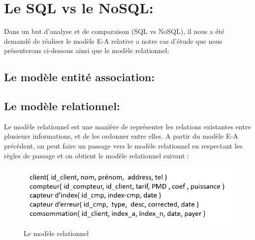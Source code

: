 \section{Le SQL vs le NoSQL:}
Dans un but d'analyse et de comparaison (SQL vs NoSQL), il nous a été demandé de réaliser le modèle E-A relative a notre cas d'étude que nous présenterons ci-dessous ainsi que le modèle relationnel:

\subsection{Le modèle entité association:}


\subsection{Le modèle relationnel:}
Le modèle relationnel est une manière de représenter les relations existantes entre plusieurs informations, et de les ordonner entre elles.
A partir du modèle E-A précédent, on peut faire un passage vers le modèle relationnel en respectant les règles de passage et on obtient le modèle relationnel suivant :

\begin{figure}[h]
	\centering
	\includegraphics[scale=1]{img/part2/2.6.png}
	\caption{Le modèle relationnel}
\end{figure}
